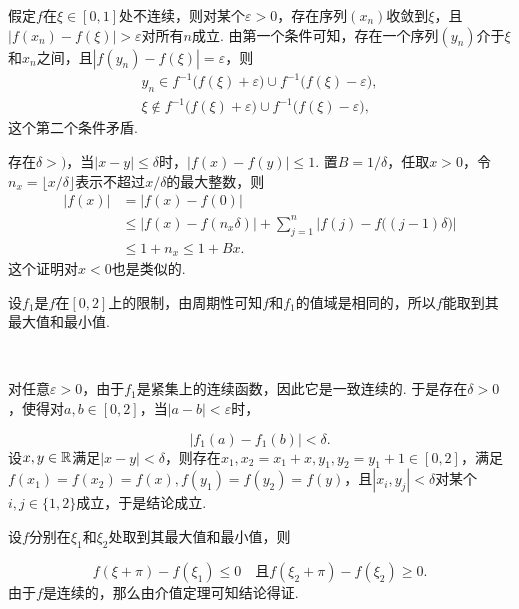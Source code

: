 \begin{ans}
  假定$f$在$\xi\in[0,1]$处不连续，则对某个$\varepsilon>0$，存在序列$(x_n)$收敛到$\xi$，且$|f(x_n)-f(\xi)|>\varepsilon$对所有$n$成立.
  由第一个条件可知，存在一个序列$(y_n)$介于$\xi$和$x_n$之间，且$|f(y_n)-f(\xi)|=\varepsilon$，则
  \begin{gather*}
    y_n\in f^{-1}\big( f(\xi)+\varepsilon \big)\cup
    f^{-1}\big( f(\xi)-\varepsilon \big),\\
    \xi\notin f^{-1}\big( f(\xi)+\varepsilon \big)\cup
    f^{-1}\big( f(\xi)-\varepsilon \big),
  \end{gather*}
  这个第二个条件矛盾.
\end{ans}

\begin{ans}
  存在$\delta>)$，当$|x-y|\le\delta$时，$|f(x)-f(y)|\le1$. 置$B=1/\delta$，任取$x>0$，令$n_x=\lfloor x/\delta\rfloor$表示不超过$x/\delta$的最大整数，则
  \begin{align*}
    |f(x)| & = |f(x) - f(0)|\\
           & \le |f(x)-f(n_x\delta)| + \sum_{j=1}^n
           \big| f(j)-f\big( (j-1)\delta \big)\big|\\
           & \le 1+n_x\le 1+Bx.
  \end{align*}
  这个证明对$x<0$也是类似的.
\end{ans}

\begin{ans}
  \begin{enumb}
    \item 设$f_1$是$f$在$[0,2]$上的限制，由周期性可知$f$和$f_1$的值域是相同的，所以$f$能取到其最大值和最小值.
  \end{enumb}\\
  \begin{enumb}\setcounter{enumi}{1}
    \item 对任意$\varepsilon>0$，由于$f_1$是紧集上的连续函数，因此它是一致连续的. 于是存在$\delta>0$，使得对$a,b\in[0,2]$，当$|a-b|<\varepsilon$时，
  \end{enumb}
        \[ |f_1(a)-f_1(b)|<\delta. \]
        设$x,y\in\mathbb R$满足$|x-y|<\delta$，则存在$x_1,x_2=x_1+x,y_1,y_2=y_1+1\in[0,2]$，满足$f(x_1)=f(x_2)=f(x),f(y_1)=f(y_2)=f(y)$，且$|x_i,y_j|<\delta$对某个$i,j\in\{1,2\}$成立，于是结论成立.\\
  \begin{enumb}\setcounter{enumi}{2}
    \item 设$f$分别在$\xi_1$和$\xi_2$处取到其最大值和最小值，则
  \end{enumb}
      \[ f(\xi+\pi)-f(\xi_1)\le 0 \quad \text{且}
      f(\xi_2+\pi)-f(\xi_2)\ge0. \]
  由于$f$是连续的，那么由介值定理可知结论得证.
\end{ans}

